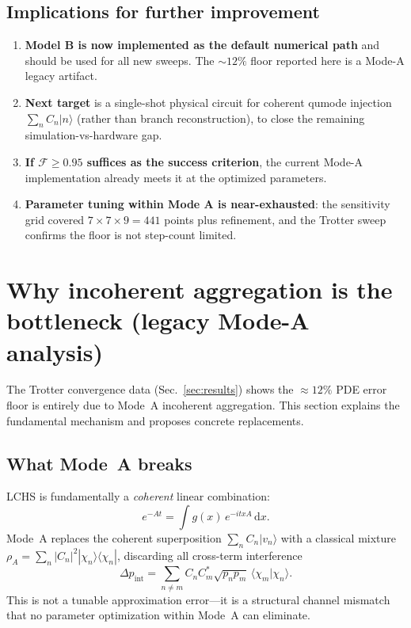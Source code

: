 \documentclass[11pt]{article}
\newcommand{\dd}{\mathrm{d}}
\begin{document}
\subsection{Implications for further improvement}

\begin{enumerate}[itemsep=3pt,topsep=3pt]
\item \textbf{Model B is now implemented as the default numerical path} and should be used for
      all new sweeps. The $\sim 12\%$ floor reported here is a Mode-A legacy artifact.
\item \textbf{Next target} is a single-shot physical circuit for coherent qumode injection
      $\sum_n C_n|n\rangle$ (rather than branch reconstruction), to close the remaining
      simulation-vs-hardware gap.
\item \textbf{If $\mathcal{F}\ge 0.95$ suffices as the success criterion},
      the current Mode-A implementation already meets it at the optimized parameters.
\item \textbf{Parameter tuning within Mode A is near-exhausted}:
      the sensitivity grid covered $7\times 7\times 9 = 441$ points plus refinement,
      and the Trotter sweep confirms the floor is not step-count limited.
\end{enumerate}

\section{Why incoherent aggregation is the bottleneck (legacy Mode-A analysis)}
\label{sec:coherence_gap}

The Trotter convergence data (Sec.~\ref{sec:results}) shows the $\approx 12\%$ PDE error
floor is entirely due to Mode~A incoherent aggregation.
This section explains the fundamental mechanism and proposes concrete replacements.

\subsection{What Mode~A breaks}

LCHS is fundamentally a \emph{coherent} linear combination:
\[
e^{-At} = \int g(x)\,e^{-itxA}\,\dd x.
\]
Mode~A replaces the coherent superposition $\sum_n C_n |v_n\rangle$ with a classical mixture
$\rho_A = \sum_n |C_n|^2 |\chi_n\rangle\!\langle\chi_n|$, discarding all cross-term interference
\[
\Delta p_{\mathrm{int}} = \sum_{n\neq m} C_n C_m^* \sqrt{p_n p_m}\,\langle\chi_m|\chi_n\rangle.
\]
This is not a tunable approximation error---it is a structural channel mismatch
that no parameter optimization within Mode~A can eliminate.
\end{document}
